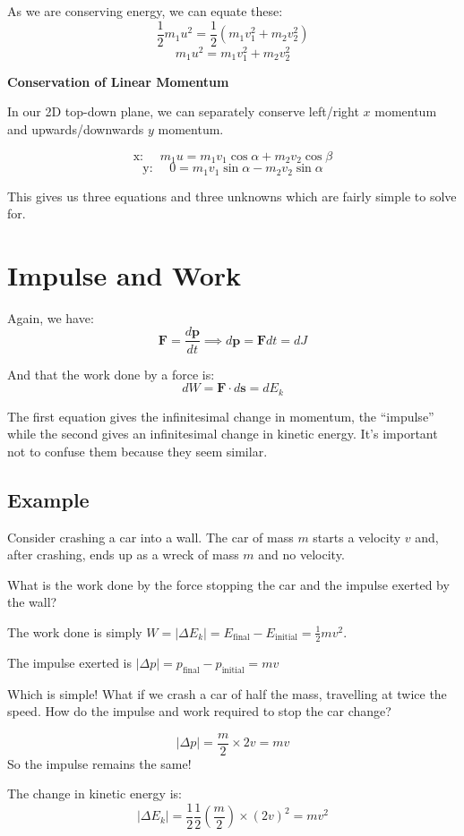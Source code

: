 As we are conserving energy, we can equate these:
\[
    \frac{1}{2}m_1 u^2 = \frac{1}{2} \left(m_1 v_1^2 + m_2 v_2^2\right)
\]
\[
    m_1 u^2 = m_1 v_1^2 + m_2 v_2^2 \tag{1}
\]


\textbf{Conservation of Linear Momentum}

In our 2D top-down plane, we can separately conserve left/right $x$ momentum and upwards/downwards $y$ momentum.

\[
    \text{x: } \quad m_1 u = m_1 v_1 \cos \alpha + m_2 v_2 \cos \beta \tag{2}
\]
\[
    \text{y: } \quad 0 = m_1 v_1 \sin \alpha - m_2 v_2 \sin \alpha \tag{3}
\]

This gives us three equations and three unknowns which are fairly simple to solve for.

\section{Impulse and Work}
Again, we have:
\[
    \pmb{F} = \frac{d \pmb{p}}{dt} \implies d \pmb{p} = \pmb{F} dt = dJ
\]

And that the work done by a force is:
\[
    dW = \pmb{F} \cdot d \pmb{s} = dE_k
\]

The first equation gives the infinitesimal change in momentum, the ``impulse'' while the second gives an infinitesimal change in kinetic energy. It's important not to confuse them because they seem similar.

\subsection{Example}
Consider crashing a car into a wall. The car of mass $m$ starts a velocity $v$ and, after crashing, ends up as a wreck of mass $m$ and no velocity.

What is the work done by the force stopping the car and the impulse exerted by the wall?

The work done is simply $W = |\Delta E_k| = E_\text{final} - E_\text{initial} = \frac{1}{2}mv^2$.

The impulse exerted is $|\Delta p| = p_\text{final} - p_\text{initial} = mv$

Which is simple! What if we crash a car of half the mass, travelling at twice the speed. How do the impulse and work required to stop the car change?

\[
    |\Delta p| = \frac{m}{2} \times 2v = mv
\]
So the impulse remains the same!

The change in kinetic energy is:
\[
    |\Delta E_k| = \frac{1}{2} \frac{1}{2} \left(\frac{m}{2}\right) \times \left(2v\right)^2 = mv^2
\]

